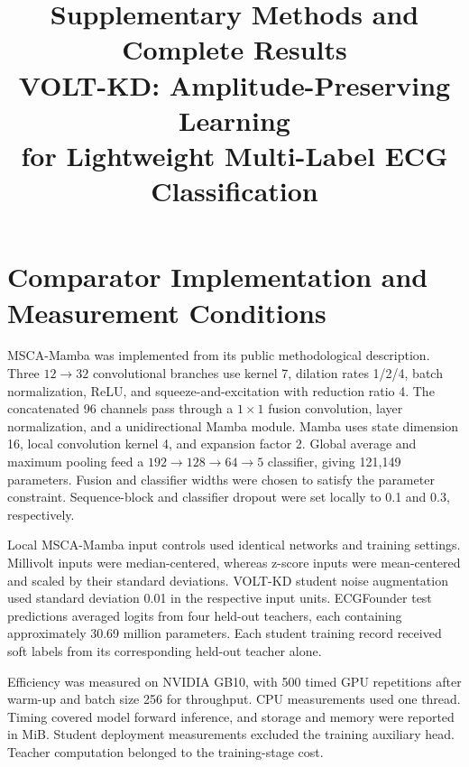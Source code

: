 \documentclass[11pt,a4paper]{article}
\title{\textbf{Supplementary Methods and Complete Results}\\[0.5em]\large VOLT-KD: Amplitude-Preserving Learning\\for Lightweight Multi-Label ECG Classification}
\author{}
\date{}
\begin{document}
\maketitle
\vspace{-2em}
\setcounter{table}{0}
\setcounter{figure}{0}
\section{Comparator Implementation and Measurement Conditions}
MSCA-Mamba was implemented from its public methodological description\cite{cetintas2026}. Three $12\rightarrow32$ convolutional branches use kernel 7, dilation rates 1/2/4, batch normalization, ReLU, and squeeze-and-excitation with reduction ratio 4. The concatenated 96 channels pass through a $1\times1$ fusion convolution, layer normalization, and a unidirectional Mamba module. Mamba uses state dimension 16, local convolution kernel 4, and expansion factor 2. Global average and maximum pooling feed a $192\rightarrow128\rightarrow64\rightarrow5$ classifier, giving 121,149 parameters. Fusion and classifier widths were chosen to satisfy the parameter constraint. Sequence-block and classifier dropout were set locally to 0.1 and 0.3, respectively.

Local MSCA-Mamba input controls used identical networks and training settings. Millivolt inputs were median-centered, whereas z-score inputs were mean-centered and scaled by their standard deviations. VOLT-KD student noise augmentation used standard deviation 0.01 in the respective input units. ECGFounder test predictions averaged logits from four held-out teachers, each containing approximately 30.69 million parameters. Each student training record received soft labels from its corresponding held-out teacher alone.

Efficiency was measured on NVIDIA GB10, with 500 timed GPU repetitions after warm-up and batch size 256 for throughput. CPU measurements used one thread. Timing covered model forward inference, and storage and memory were reported in MiB. Student deployment measurements excluded the training auxiliary head. Teacher computation belonged to the training-stage cost.
\end{document}
